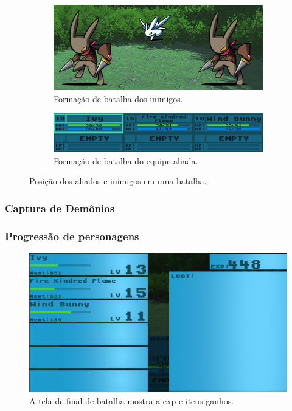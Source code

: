 \documentclass[
	12pt,				%
	openright,			%
	twoside,			%
	a4paper,			%
	english,			%
	french,				%
	spanish,			%
	brazil				%
	]{abntex2}
\begin{document}
\begin{figure}[h!]
  \centering
  \begin{subfigure}[b]{0.5\linewidth}
    \includegraphics[width=\linewidth]{enemyformation.jpg}
     \caption{Formação de batalha dos inimigos.}
  \end{subfigure}
  \begin{subfigure}[b]{0.5\linewidth}
    \includegraphics[width=\linewidth]{partyformation.jpg}
    \caption{Formação de batalha do equipe aliada.}
  \end{subfigure}
  \caption{Posição dos aliados e inimigos em uma batalha.}
  \label{fig:battle3}
\end{figure}

\subsubsection{Captura de Demônios}
\subsubsection{Progressão de personagens}

\begin{figure}[h!]
 \centering
  \includegraphics[width=0.5\linewidth]{endscreen.jpg}
  \caption{A tela de final de batalha mostra a exp e itens ganhos.}
  \label{fig:exp}
\end{figure}
\end{document}
